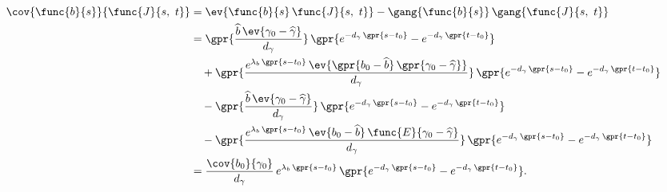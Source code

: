 \begin{align}
    \cov{\func{b}{s}}{\func{J}{s,\ t}} &= \ev{\func{b}{s}\,\func{J}{s,\ t}} - \gang{\func{b}{s}}\,\gang{\func{J}{s,\ t}} \nonumber \\
    	&= \gpr{\frac{\widehat{b}\,\ev{\gamma_0 - \widehat{\gamma}}}{d_{\gamma}}}\,\gpr{e^{-d_{\gamma}\,\gpr{s - t_0}} - e^{-d_{\gamma}\,\gpr{t - t_0}}} \nonumber \\
    		&\quad + \gpr{\frac{e^{\lambda_{b}\,\gpr{s - t_0}}\,\ev{\gpr{b_0 - \widehat{b}}\,\gpr{\gamma_0 - \widehat{\gamma}}}}{d_{\gamma}}}\,\gpr{e^{-d_{\gamma}\,\gpr{s - t_0}} - e^{-d_{\gamma}\,\gpr{t - t_0}}} \nonumber \\
    		&\quad - \gpr{\frac{\widehat{b}\,\ev{\gamma_0 - \widehat{\gamma}}}{d_{\gamma}}}\,\gpr{e^{-d_{\gamma}\,\gpr{s - t_0}} - e^{-d_{\gamma}\,\gpr{t - t_0}}} \nonumber \\
    		&\quad - \gpr{\frac{e^{\lambda_{b}\,\gpr{s - t_0}}\,\ev{b_0 - \widehat{b}}\,\func{E}{\gamma_0 - \widehat{\gamma}}}{d_{\gamma}}}\,\gpr{e^{-d_{\gamma}\,\gpr{s - t_0}} - e^{-d_{\gamma}\,\gpr{t - t_0}}} \nonumber \\
    	&= \frac{\cov{b_0}{\gamma_0}}{d_{\gamma}}\,e^{\lambda_{b}\,\gpr{s - t_0}}\,\gpr{e^{-d_{\gamma}\,\gpr{s - t_0}} - e^{-d_{\gamma}\,\gpr{t - t_0}}}. \label{eqn:cov_bs_Jst}
\end{align}
